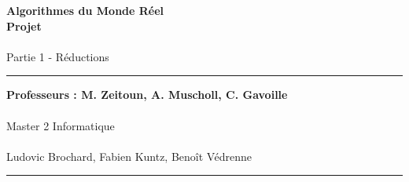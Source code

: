 \documentclass[a4paper]{article}
\newlength{\larg}
\begin{document}
\thispagestyle{empty}

\setlength{\unitlength}{1in}


\begin{flushright}
 \noindent {\rule{\larg}{0.5mm}}
\end{flushright}
\vspace{7mm}
\begin{flushright}
 \Huge{\bf Algorithmes du Monde Réel} \\
 \Huge{\bf Projet} \\
 ~\\
 \huge{Partie 1 - Réductions}\\
\end{flushright}
\vspace{7mm}
\begin{flushright}
 {\rule{\larg}{0.5mm}}
\end{flushright}
\vspace{2mm}
\begin{flushright}
 \large{\bf Professeurs : M. Zeitoun, A. Muscholl, C. Gavoille} \\
 ~\\
 \large{Master 2 Informatique}\\
 ~\\
 \vspace{10cm}
 \large{Ludovic Brochard, Fabien Kuntz, Benoît Védrenne}
{\rule{\larg}{0.5mm}}
\end{flushright}

\newpage

\addtolength{\oddsidemargin}{1cm}

\thispagestyle{empty}
\tableofcontents
\newpage

\setcounter{page}{1}










\end{document}
